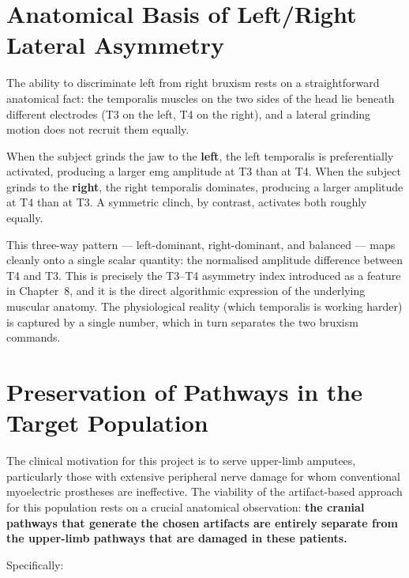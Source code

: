 \section{Anatomical Basis of Left/Right Lateral Asymmetry}
\label{sec:med_lateral}

The ability to discriminate left from right bruxism rests on a
straightforward anatomical fact: the temporalis muscles on the two
sides of the head lie beneath different electrodes (T3 on the left,
T4 on the right), and a lateral grinding motion does not recruit them
equally.

When the subject grinds the jaw to the \textbf{left}, the left
temporalis is preferentially activated, producing a larger
\acrshort{emg} amplitude at T3 than at T4. When the subject grinds to
the \textbf{right}, the right temporalis dominates, producing a larger
amplitude at T4 than at T3. A symmetric clinch, by contrast, activates
both roughly equally.

This three-way pattern --- left-dominant, right-dominant, and balanced
--- maps cleanly onto a single scalar quantity: the normalised
amplitude difference between T4 and T3. This is precisely the T3--T4
asymmetry index introduced as a feature in Chapter~8, and it is the
direct algorithmic expression of the underlying muscular anatomy. The
physiological reality (which temporalis is working harder) is captured
by a single number, which in turn separates the two bruxism commands.

\section{Preservation of Pathways in the Target Population}
\label{sec:med_intact}

The clinical motivation for this project is to serve upper-limb
amputees, particularly those with extensive peripheral nerve damage
for whom conventional myoelectric prostheses are ineffective. The
viability of the artifact-based approach for this population rests on
a crucial anatomical observation: \textbf{the cranial pathways that
generate the chosen artifacts are entirely separate from the
upper-limb pathways that are damaged in these patients.}

Specifically:

